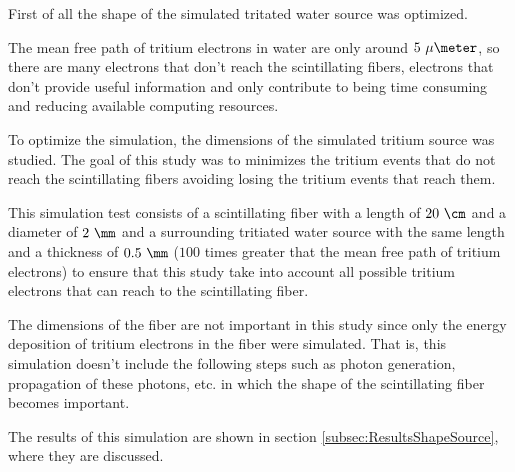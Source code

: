 First of all the shape of the simulated tritated water source was optimized. 

The mean free path of tritium electrons in water are only around $5~\mu\meter$, so there are many electrons that don't reach the scintillating fibers, electrons that don't provide useful information and only contribute to being time consuming and reducing available computing resources.

To optimize the simulation, the dimensions of the simulated tritium source was studied. The goal of this study was to minimizes the tritium events that do not reach the scintillating fibers avoiding losing the tritium events that reach them.

This simulation test consists of a scintillating fiber with a length of $20~\cm$ and a diameter of $2~\mm$ and a surrounding tritiated water source with the same length and a thickness of $0.5~\mm$ ($100$ times greater that the mean free path of tritium electrons) to ensure that this study take into account all possible tritium electrons that can reach to the scintillating fiber. 

The dimensions of the fiber are not important in this study since only the energy deposition of tritium electrons in the fiber were simulated. That is, this simulation doesn't include the following steps such as photon generation, propagation of these photons, etc. in which the shape of the scintillating fiber becomes important.


The results of this simulation are shown in section \ref{subsec:ResultsShapeSource}, where they are discussed.
